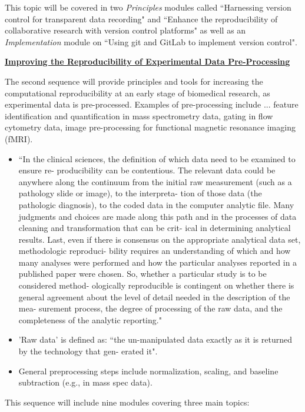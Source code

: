 \documentclass[pdftex,english,11pt,parskip=half]{scrartcl}
\begin{document}
This
topic will be covered in two \textit{Principles} modules called ``Harnessing
version control for transparent data recording" and ``Enhance the
reproducibility of collaborative research with version control platforms" as
well as an \textit{Implementation} module on ``Using git and GitLab to implement
version control".

\underline{\textbf{Improving the Reproducibility of Experimental Data
Pre-Processing}}

The second sequence will provide principles and tools for increasing the
computational reproducibility at an early stage of biomedical research, as
experimental data is pre-processed. Examples of pre-processing include ... feature identification and quantification in mass spectrometry data, gating in flow cytometry data, image pre-processing for functional magnetic resonance imaging (fMRI). 

\begin{itemize}
\item ``In the clinical sciences, the definition of which data need to be examined to ensure re- producibility can be contentious. The relevant data could be anywhere along the continuum from the initial raw measurement (such as a pathology slide or image), to the interpreta- tion of those data (the pathologic diagnosis), to the coded data in the computer analytic file. Many judgments and choices are made along this path and in the processes of data cleaning and transformation that can be crit- ical in determining analytical results. Last, even if there is consensus on the appropriate analytical data set, methodologic reproduci- bility requires an understanding of which and how many analyses were performed and how the particular analyses reported in a published paper were chosen. So, whether a particular study is to be considered method- ologically reproducible is contingent on whether there is general agreement about the level of detail needed in the description of the mea- surement process, the degree of processing of the raw data, and the completeness of the analytic reporting." \cite{goodman2016does}
\item 'Raw data' is defined as: ``the un-manipulated data exactly as it is returned by the technology that gen- erated it". \cite{shade2015computing}
\item General preprocessing steps include normalization, scaling, and baseline subtraction (e.g., in mass spec data).
\end{itemize}

This sequence will include nine modules
covering three main topics: 
\end{document}
